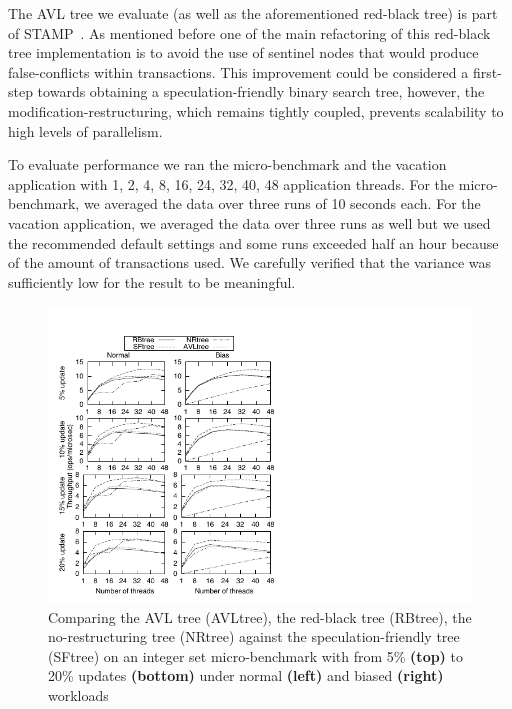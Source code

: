 The AVL tree we evaluate (as well as the aforementioned red-black tree) is part of STAMP~\cite{CCKO08}. 
As mentioned before one of the main refactoring of this red-black tree implementation is to avoid the use of sentinel nodes that would 
produce false-conflicts within transactions. This improvement could be considered a first-step towards obtaining a speculation-friendly binary 
search tree, however, the modification-restructuring, which remains tightly coupled, prevents scalability to high levels of parallelism.

To evaluate performance we ran the micro-benchmark and the vacation application with 1, 2, 4, 8, 16, 24, 32, 40, 48 application threads.
For the micro-benchmark, we averaged the data over three runs of 10 seconds each. For the vacation application, we averaged the data over 
three runs as well but we used 
the recommended default settings and some runs exceeded half an hour because of the amount of transactions used. 
We carefully verified that the variance was sufficiently low for the result to be meaningful.

\begin{figure}[t]
	\begin{center}
	\includegraphics[scale=1.8,clip=true,viewport=9 0 192 228]{Tree/fig/microbench/microbench_avg_4096}
	\caption{Comparing the AVL tree (AVLtree), the red-black tree (RBtree), the no-restructuring tree (NRtree) against the speculation-friendly tree (SFtree) on an integer set micro-benchmark with from 5\% {\bf (top)} to 20\% updates {\bf (bottom)} under normal {\bf (left)} and biased {\bf (right)}  workloads\label{fig:microbench}}
	\end{center}
\end{figure}

